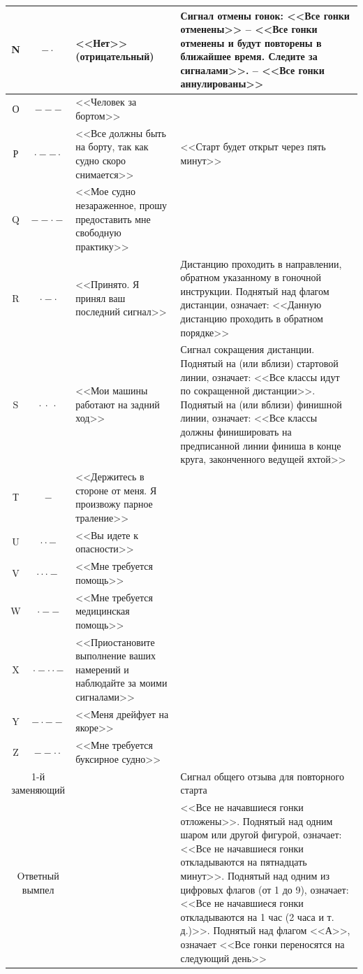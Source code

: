 \documentclass[a4paper, 12pt, twoside, final]{scrbook}
\begin{document}
\begin{longtable}{ccp{}p{}}
	\midrule
	N & \Huge $- \cdot$ & <<Нет>> (отрицательный) & Сигнал отмены гонок: <<Все   гонки   отменены>> \--- <<Все гонки отменены    и будут   повторены в ближайшее время.   Следите за сигналами>>. \--- <<Все гонки аннулированы>> \\
	\midrule
	О & \Huge $- - -$ & <<Человек за бортом>> & \\
	\midrule
	Р & \Huge $\cdot - - \cdot$ & <<Все должны быть на борту, так как судно скоро снимается>> & <<Старт будет открыт через пять минут>> \\
	\midrule
	Q & \Huge $- - \cdot -$ & <<Мое судно незараженное, прошу   предоставить    мне   свободную практику>> & \\
	\midrule
	R & \Huge $\cdot - \cdot$ & <<Принято. Я принял ваш   последний сигнал>> & Дистанцию проходить в направлении, обратном указанному в гоночной инструкции. Поднятый над флагом дистанции, означает:    <<Данную   дистанцию   проходить в обратном порядке>> \\
	\midrule
	S & \Huge $\cdot\ \cdot\ \cdot$ & <<Мои  машины   работают   на задний ход>> & Сигнал сокращения дистанции. Поднятый на (или вблизи) стартовой линии, означает: <<Все классы идут по сокращенной дистанции>>. Поднятый на (или вблизи) финишной линии, означает: <<Все классы должны финишировать   на    предписанной   линии финиша в  конце   круга,    законченного ведущей яхтой>> \\
	\midrule
	Т & \Huge $-$ & <<Держитесь в стороне от меня.   Я   произвожу   парное траление>> & \\
	\midrule
	U & \Huge $\cdot \cdot -$ & <<Вы идете к  опасности>> & \\
	\midrule
	V & \Huge $\cdot \cdot \cdot -$ & <<Мне требуется помощь>>  & \\
	\midrule
	W & \Huge $\cdot - -$ & <<Мне   требуется   медицинская помощь>> & \\
	\midrule
	X & \Huge $\cdot - \cdot \cdot -$ & <<Приостановите       выполнение ваших намерений и   наблюдайте за моими сигналами>> & \\
	\midrule
	Y & \Huge $- \cdot - -$ & <<Меня дрейфует на якоре>> & \\
	\midrule
	Z & \Huge $ - - \cdot \cdot$ & <<Мне     требуется      буксирное судно>> & \\
	\midrule
	\multicolumn{2}{c}{1-й заменяющий} & & Сигнал общего   отзыва    для    повторного старта \\
	\midrule
	\multicolumn{2}{c}{Oтветный вымпел} & & <<Все не начавшиеся  гонки отложены>>. Поднятый над одним шаром  или   другой фигурой, означает:   <<Все не начавшиеся гонки   откладываются   на  пятнадцать минут>>. Поднятый над одним из   цифровых  флагов (от 1 до 9), означает: <<Все не начавшиеся гонки откладываются на   1 час (2 часа и т.\,д.)>>. Поднятый над   флагом  <<А>>, означает <<Все гонки переносятся   на  следующий день>> \\
	\bottomrule
\end{longtable}
\end{document}
